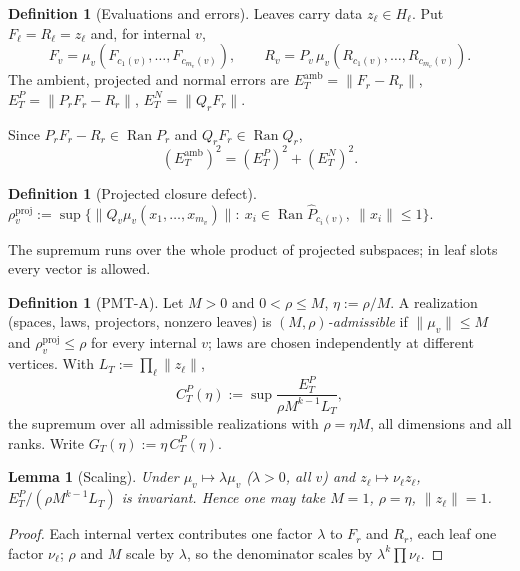 \documentclass[11pt]{amsart}
\newtheorem{lemma}[theorem]{Lemma}
\theoremstyle{definition}
\newtheorem{definition}[theorem]{Definition}
\newcommand{\Ran}{\operatorname{Ran}}
\newcommand{\amb}{\mathrm{amb}}
\newcommand{\proj}{\mathrm{proj}}
\newcommand{\norm}[1]{\lVert #1\rVert}
\newcommand{\PMTA}{\textsf{PMT-A}}
\begin{document}
\begin{definition}[Evaluations and errors]
Leaves carry data $z_\ell\in H_\ell$. Put $F_\ell=R_\ell=z_\ell$ and, for internal $v$,
\[
F_v=\mu_v(F_{c_1(v)},\dots,F_{c_{m_v}(v)}),\qquad R_v=P_v\,\mu_v(R_{c_1(v)},\dots,R_{c_{m_v}(v)}).
\]
The ambient, projected and normal errors are $E^\amb_T=\norm{F_r-R_r}$,
$E^P_T=\norm{P_rF_r-R_r}$, $E^N_T=\norm{Q_rF_r}$.
\end{definition}

Since $P_rF_r-R_r\in\Ran P_r$ and $Q_rF_r\in\Ran Q_r$,
\begin{equation}\label{eq:pyth}
(E^\amb_T)^2=(E_T^P)^2+(E^N_T)^2 .
\end{equation}

\begin{definition}[Projected closure defect]
$\rho_v^\proj:=\sup\{\norm{Q_v\mu_v(x_1,\dots,x_{m_v})}:\ x_i\in\Ran\widehat P_{c_i(v)},\ \norm{x_i}\le1\}.$
\end{definition}

The supremum runs over the whole product of projected subspaces; in leaf slots
every vector is allowed.

\begin{definition}[\PMTA]\label{def:PMTA}
Let $M>0$ and $0<\rho\le M$, $\eta:=\rho/M$. A realization (spaces, laws,
projectors, nonzero leaves) is \emph{$(M,\rho)$-admissible} if $\norm{\mu_v}\le M$
and $\rho^\proj_v\le\rho$ for every internal $v$; laws are chosen independently at
different vertices. With $L_T:=\prod_\ell\norm{z_\ell}$,
\[
C_T^P(\eta):=\sup\frac{E^P_T}{\rho M^{k-1}L_T},
\]
the supremum over all admissible realizations with $\rho=\eta M$, all dimensions and
all ranks. Write $G_T(\eta):=\eta\, C^P_T(\eta)$.
\end{definition}

\begin{lemma}[Scaling]\label{lem:scaling}
Under $\mu_v\mapsto\lambda\mu_v$ ($\lambda>0$, all $v$) and $z_\ell\mapsto\nu_\ell z_\ell$,
$E^P_T/(\rho M^{k-1}L_T)$ is invariant. Hence one may take $M=1$, $\rho=\eta$,
$\norm{z_\ell}=1$.
\end{lemma}
\begin{proof}
Each internal vertex contributes one factor $\lambda$ to $F_r$ and $R_r$, each leaf
one factor $\nu_\ell$; $\rho$ and $M$ scale by $\lambda$, so the denominator scales by
$\lambda^k\prod\nu_\ell$.
\end{proof}
\end{document}
